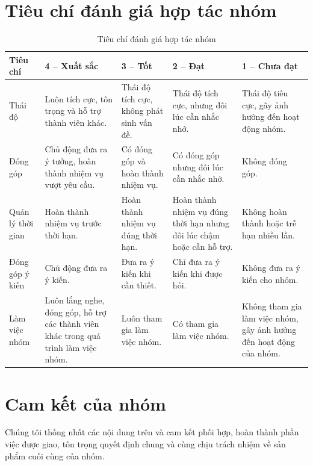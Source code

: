 \documentclass[12pt,a4paper,oneside]{report}
\begin{document}
\section{Tiêu chí đánh giá hợp tác nhóm}\label{sec:tieu_chi}

\begin{table}[H]
\centering
\small
\vspace{-0.8cm}
\caption{Tiêu chí đánh giá hợp tác nhóm}\label{tab:rubric_danh_gia}
\renewcommand{\arraystretch}{1.3}
\begin{tabular}{|>{\raggedright}p{2.4cm}|*{4}{>{\raggedright\arraybackslash}p{2.8cm}|}}
\hline
\textbf{Tiêu chí} &
\textbf{4 -- Xuất sắc} &
\textbf{3 -- Tốt} &
\textbf{2 -- Đạt} &
\textbf{1 -- Chưa đạt} \\ \hline
Thái độ &
Luôn tích cực, tôn trọng và hỗ trợ thành viên khác. &
Thái độ tích cực, không phát sinh vấn đề. &
Thái độ tích cực, nhưng đôi lúc cần nhắc nhở. &
Thái độ tiêu cực, gây ảnh hưởng đến hoạt động nhóm. \\ \hline
Đóng góp &
Chủ động đưa ra ý tưởng, hoàn thành nhiệm vụ vượt yêu cầu. &
Có đóng góp và hoàn thành nhiệm vụ. &
Có đóng góp nhưng đôi lúc cần nhắc nhở. &
Không đóng góp. \\ \hline
Quản lý thời gian &
Hoàn thành nhiệm vụ trước thời hạn. &
Hoàn thành nhiệm vụ đúng thời hạn. &
Hoàn thành nhiệm vụ đúng thời hạn nhưng đôi lúc chậm hoặc cần hỗ trợ. &
Không hoàn thành hoặc trễ hạn nhiều lần. \\ \hline
Đóng góp ý kiến &
Chủ động đưa ra ý kiến. &
Đưa ra ý kiến khi cần thiết. &
Chỉ đưa ra ý kiến khi được hỏi. &
Không đưa ra ý kiến cho nhóm. \\ \hline
Làm việc nhóm &
Luôn lắng nghe, đóng góp, hỗ trợ các thành viên khác trong quá trình làm việc nhóm. &
Luôn tham gia làm việc nhóm. &
Có tham gia làm việc nhóm. &
Không tham gia làm việc nhóm, gây ảnh hưởng đến hoạt động của nhóm. \\ \hline
\end{tabular}
\end{table}

\section{Cam kết của nhóm}

Chúng tôi thống nhất các nội dung trên và cam kết phối hợp, hoàn thành phần việc được giao, tôn trọng quyết định chung và cùng chịu trách nhiệm về sản phẩm cuối cùng của nhóm.
\end{document}
